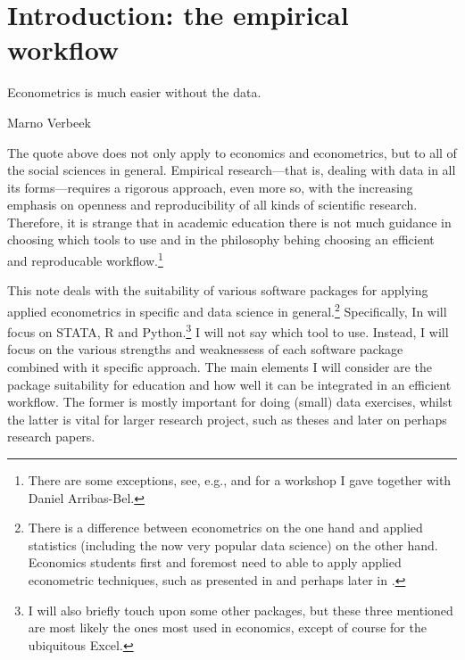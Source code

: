 \documentclass[fleqn,10pt]{SelfArx} %
\affiliation{\textsuperscript{1}\textit{Department of Spatial Economics, Vrije Universiteit Amsterdam, Amsterdam, The Netherlands}} %
\affiliation{*\textbf{Corresponding author}: \Letter{} t.de.graaff@vu.nl; \Mundus{} \href{thomasdegraaff.nl}{thomasdegraaff.nl}} %
\begin{document}
\maketitle %
\thispagestyle{empty} %


\section*{Introduction: the empirical workflow} %

\epigraph{Econometrics is much easier without the data.}{Marno Verbeek}

The quote above does not only apply to economics and econometrics, but to all of
the social sciences in general. Empirical research---that is, dealing with data in
all its forms---requires a rigorous approach, even more so, with the increasing
emphasis on openness and reproducibility of all kinds of scientific research. Therefore, it is strange
that in academic education there is not much guidance in choosing which tools to
use and in the philosophy behing choosing an efficient and reproducable
workflow.\footnote{There are some exceptions, see, e.g.,
  \citet{healy2011choosing} and \citet{Arribas-Bel2014misc} for a workshop I gave together with Daniel Arribas-Bel.}

This note deals with the suitability of various software packages for applying
applied econometrics in specific and data science in general.\footnote{There
  is a difference between econometrics on the one hand and applied statistics (including the now very popular data science) on the other hand. Economics students first and foremost need to able to apply
  applied econometric techniques, such as presented in \citet{stock2007introduction} and perhaps later in
  \citet{angrist2008mostly}.}
Specifically, In will focus on STATA, R and Python.\footnote{I will also briefly
  touch upon some other packages, but these three mentioned are most likely the
  ones most used in economics, except of course for the ubiquitous Excel.}
I will not say which tool to use. Instead, I will focus on the various strengths
and weaknessess of each software package combined with it specific approach. The
main elements I will consider are the package suitability for education and how
well it can be integrated in an efficient workflow. The former is mostly
important for doing (small) data exercises, whilst the latter is vital for
larger research project, such as theses and later on perhaps research papers.  
\end{document}
